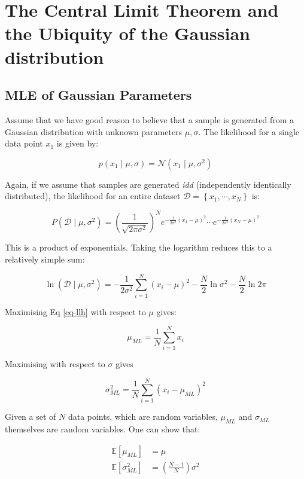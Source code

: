 

\chapter{The Central Limit Theorem and the Ubiquity of the Gaussian distribution}
\section{MLE of Gaussian Parameters}
Assume that we have good reason to believe that a sample is generated from a Gaussian distribution with unknown parameters $\mu, \sigma$.
The likelihood for a single data point $x_1$ is given by:

$$
p(x_1 \mid \mu, \sigma) = \mathcal{N}(x_1 \mid \mu, \sigma^2)
$$

Again, if we assume that samples are generated \emph{idd} (independently identically distributed), the likelihood for an entire dataset $\mathcal{D} = \left\{ x_1, \cdots, x_N \right\}$ is:

$$
P(\mathcal{D} \mid \mu, \sigma^2) = (\frac{1}{\sqrt{2 \pi \sigma^2}})^N e^{-\frac{1}{2 \sigma^2}(x_1 -\mu)^2} \cdots e^{-\frac{1}{2 \sigma^2}(x_N -\mu)^2}
$$

This is a product of exponentials. Taking the logarithm  reduces this to a relatively simple sum:

\begin{equation}
\ln (\mathcal{D} \mid \mu,\sigma^2) = -\frac{1}{2 \sigma^2}\sum^N_{i=1} (x_i - \mu)^2 - \frac{N}{2} \ln \sigma^2 - \frac{N}{2} \ln 2 \pi
\label{eq-llh}
\end{equation}

Maximising Eq \ref{eq-llh} with respect to $\mu$ gives:

\begin{equation}
\mu_{ML} = \frac{1}{N} \sum^N_{i=1} x_i
\end{equation}

Maximising with respect to $\sigma$ gives

\begin{equation}
\sigma^2_{ML} = \frac{1}{N} \sum^N_{i=1} (x_i - \mu_{ML})^2
\end{equation}


Given a set of $N$ data points, which are random variables, $\mu_{ML}$ and $\sigma_{ML}$ themselves are random variables.     One can show that:

\begin{align}
\mathbb{E}[\mu_{ML}] & = \mu \\
\mathbb{E}[\sigma^2_{ML}] &= (\frac{N-1}{N}) \sigma^2 \nonumber
\end{align}

